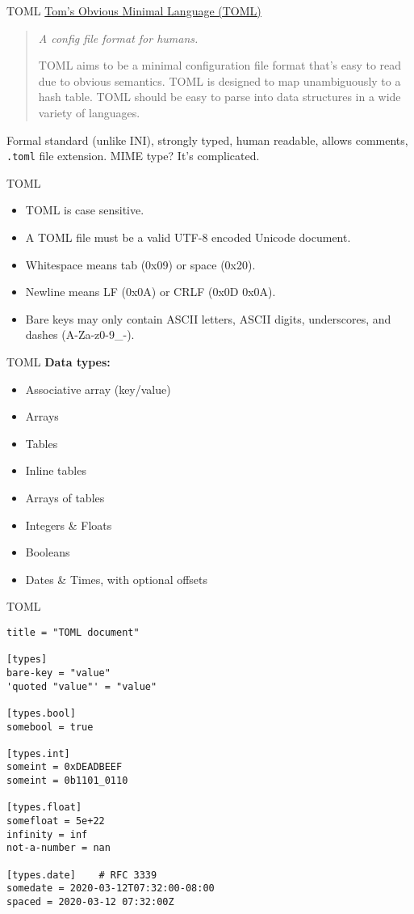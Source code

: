 \documentclass{beamer}
\begin{document}
\begin{frame}[fragile]{TOML}
  \href{https://toml.io/en/}{Tom's Obvious Minimal Language (TOML)}

  \begin{quote}
    \emph{A config file format for humans.}

    TOML aims to be a minimal configuration file format that's easy to read due to obvious semantics. TOML is designed to map unambiguously to a hash table. TOML should be easy to parse into data structures in a wide variety of languages. 
  \end{quote}

  Formal standard (unlike INI), strongly typed, human readable, allows comments, \texttt{.toml} file extension. MIME type? It's complicated.
\end{frame}

\begin{frame}[fragile]{TOML}
  \begin{itemize}
    \item TOML is case sensitive.
    \item A TOML file must be a valid UTF-8 encoded Unicode document.
    \item Whitespace means tab (0x09) or space (0x20).
    \item Newline means LF (0x0A) or CRLF (0x0D 0x0A).
    \item Bare keys may only contain ASCII letters, ASCII digits, underscores, and dashes (A-Za-z0-9\_-).
  \end{itemize}
\end{frame}

\begin{frame}[fragile]{TOML}
  \textbf{Data types:}
  \begin{itemize}
    \item Associative array (key/value)
    \item Arrays
    \item Tables
    \item Inline tables
    \item Arrays of tables
    \item Integers \& Floats
    \item Booleans
    \item Dates \& Times, with optional offsets
  \end{itemize}
\end{frame}

\begin{frame}[fragile]{TOML}
  \begin{verbatim}
title = "TOML document"

[types]
bare-key = "value"
'quoted "value"' = "value"

[types.bool]
somebool = true

[types.int]
someint = 0xDEADBEEF
someint = 0b1101_0110

[types.float]
somefloat = 5e+22
infinity = inf
not-a-number = nan

[types.date]    # RFC 3339
somedate = 2020-03-12T07:32:00-08:00
spaced = 2020-03-12 07:32:00Z
  \end{verbatim}
\end{frame}
\end{document}
